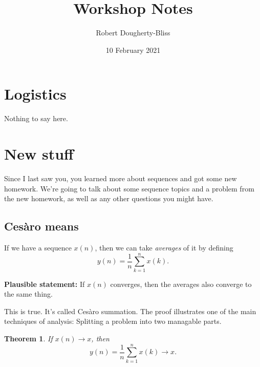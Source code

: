 \documentclass[12pt]{article}
\title{Workshop Notes}
\author{Robert Dougherty-Bliss}
\date{10 February 2021}
\newtheorem{theorem}{Theorem}
\theoremstyle{definition}
\begin{document}
\maketitle

\section*{Logistics}%
\label{sec:logistics}

Nothing to say here.

\section*{New stuff}%
\label{sec:new_stuff}

Since I last saw you, you learned more about sequences and got some new
homework. We're going to talk about some sequence topics and a problem from the
new homework, as well as any other questions you might have.

\subsection*{Ces\`aro means}%
\label{sub:cesaro_means}

If we have a sequence $x(n)$, then we can take \emph{averages} of it by
defining
\begin{equation*}
    y(n) = \frac{1}{n} \sum_{k = 1}^n x(k).
\end{equation*}

\textbf{Plausible statement:} If $x(n)$ converges, then the averages also
converge to the same thing.

This is true. It's called Ces\`aro summation. The proof illustrates one of the
main techniques of analysis: Splitting a problem into two managable parts.

\begin{theorem}
    If $x(n) \to x$, then
    \begin{equation*}
        y(n) = \frac{1}{n} \sum_{k = 1}^n x(k) \to x.
    \end{equation*}
\end{theorem}
\end{document}
